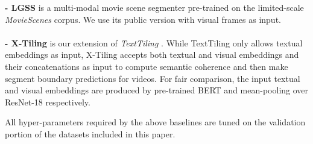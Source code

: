 \documentclass[runningheads]{llncs}
\begin{document}
\textbf{- LGSS} \cite{rao2020local} %
is a multi-modal movie scene segmenter pre-trained on the limited-scale \textit{MovieScenes} corpus. %
We use its %
public version with visual frames as input.\\
\vspace{-2ex} \\
\textbf{- X-Tiling} %
is our extension of \textit{TextTiling} \cite{hearst-1997-text}. %
While TextTiling %
only allows textual embeddings as input, X-Tiling %
accepts both textual and visual embeddings and their concatenations as input to compute semantic coherence  and then make segment boundary predictions for videos. 
For fair comparison, the input textual and visual embeddings are produced by pre-trained BERT and mean-pooling over ResNet-18 respectively.

All hyper-parameters required by the above baselines are tuned on the validation portion of the datasets included in this paper.

\vspace{-1ex}
\end{document}
